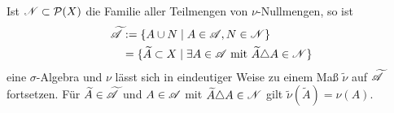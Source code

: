 \begin{proposition}
\begin{mdframed}
Ist $\NN \subset \PP(X)$ die Familie aller Teilmengen von $\nu$-Nullmengen, so ist
\begin{equation*}
	\begin{split}
		\widetilde{\AA} & := \{ A \cup N \mid A \in \AA, N \in \NN\}	\\
								& = \{\widetilde{A} \subset X \mid \exists A \in \AA \text{ mit } \widetilde{A} \triangle A \in \NN \}
	\end{split}
\end{equation*}
eine $\sigma$-Algebra und $\nu$ lässt sich in eindeutiger Weise zu einem Maß $\widetilde{\nu}$ auf $\widetilde{\AA}$ fortsetzen. 
Für $\widetilde{A} \in \widetilde{\AA}$ und $A \in \AA$ mit $\widetilde{A} \triangle A \in \NN$ gilt $\widetilde{\nu}(\widetilde{A})=  \nu (A)$.
\end{mdframed}


\end{proposition}
